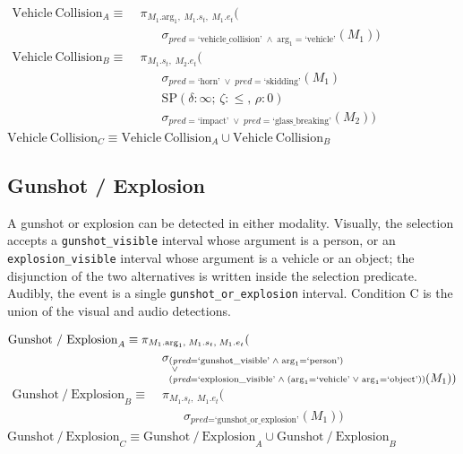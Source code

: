 \begin{flushleft}
$\begin{aligned}
\mathrm{Vehicle\ Collision}_A \equiv &\; \pi_{M_1.\mathrm{arg}_1,\; M_1.s_t,\; M_1.e_t} ( \\
&\qquad \sigma_{\textit{pred}=\text{`vehicle\_collision'} \;\land\; \mathrm{arg}_1=\text{`vehicle'}}(M_1) )
\end{aligned}$\\[6pt]
$\begin{aligned}
\mathrm{Vehicle\ Collision}_B \equiv &\; \pi_{M_1.s_t,\; M_2.e_t} ( \\
&\qquad \sigma_{\textit{pred}=\text{`horn'} \;\lor\; \textit{pred}=\text{`skidding'}}(M_1) \\
&\qquad \mathrm{SP}(\delta:\infty;\,\zeta:\le,\,\rho:0) \\
&\qquad \sigma_{\textit{pred}=\text{`impact'} \;\lor\; \textit{pred}=\text{`glass\_breaking'}}(M_2) )
\end{aligned}$\\[6pt]
$\mathrm{Vehicle\ Collision}_C \equiv \mathrm{Vehicle\ Collision}_A \cup \mathrm{Vehicle\ Collision}_B$
\end{flushleft}

\subsection{Gunshot / Explosion}

A gunshot or explosion can be detected in either modality. Visually, the selection accepts a \texttt{gunshot\_visible} interval whose argument is a person, or an \texttt{explosion\_visible} interval whose argument is a vehicle or an object; the disjunction of the two alternatives is written inside the selection predicate. Audibly, the event is a single \texttt{gunshot\_or\_explosion} interval. Condition C is the union of the visual and audio detections.

\begin{flushleft}
$\begin{aligned}
\mathrm{Gunshot\ /\ Explosion}_A \equiv &\; \pi_{M_1.\mathrm{arg}_1,\; M_1.s_t,\; M_1.e_t} ( \\
&\qquad \sigma_{\begin{subarray}{l}
  (\textit{pred}=\text{`gunshot\_visible'} \;\land\; \mathrm{arg}_1=\text{`person'}) \\
  \;\lor\; \\
  (\textit{pred}=\text{`explosion\_visible'} \;\land\; (\mathrm{arg}_1=\text{`vehicle'} \;\lor\; \mathrm{arg}_1=\text{`object'})) \displaystyle(M_1) )
  \end{subarray}}
\end{aligned}$\\[6pt]
$\begin{aligned}
\mathrm{Gunshot\ /\ Explosion}_B \equiv &\; \pi_{M_1.s_t,\; M_1.e_t} ( \\
&\qquad \sigma_{\textit{pred}=\text{`gunshot\_or\_explosion'}}(M_1) )
\end{aligned}$\\[6pt]
$\mathrm{Gunshot\ /\ Explosion}_C \equiv \mathrm{Gunshot\ /\ Explosion}_A \cup \mathrm{Gunshot\ /\ Explosion}_B$
\end{flushleft}

